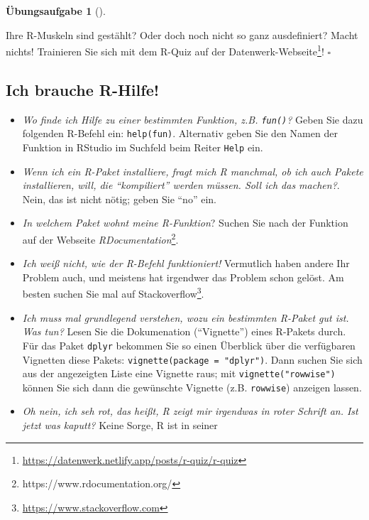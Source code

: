 \documentclass[
  a4paper,
  DIV=11]{scrreprt}
\providecommand{\tightlist}{%
  \setlength{\itemsep}{0pt}\setlength{\parskip}{0pt}}\usepackage{longtable,booktabs,array}
\theoremstyle{definition}
\newtheorem{exercise}{Übungsaufgabe}[chapter]
\theoremstyle{definition}
\theoremstyle{definition}
\theoremstyle{remark}
\begin{document}
\begin{exercise}[]\protect\hypertarget{exr-rquiz}{}\label{exr-rquiz}

Ihre R-Muskeln sind gestählt? Oder doch noch nicht so ganz ausdefiniert?
Macht nichts! Trainieren Sie sich mit dem R-Quiz auf der
Datenwerk-Webseite\footnote{\url{https://datenwerk.netlify.app/posts/r-quiz/r-quiz}}!
\(\square\)

\end{exercise}

\subsection{Ich brauche R-Hilfe!}\label{r-faq}

\begin{itemize}
\tightlist
\item
  \emph{Wo finde ich Hilfe zu einer bestimmten Funktion, z.B.
  \texttt{fun()}?} Geben Sie dazu folgenden R-Befehl ein:
  \texttt{help(fun)}. Alternativ geben Sie den Namen der Funktion in
  RStudio im Suchfeld beim Reiter \texttt{Help} ein.
\item
  \emph{Wenn ich ein R-Paket installiere, fragt mich R manchmal, ob ich
  auch Pakete installieren, will, die ``kompiliert'' werden müssen. Soll
  ich das machen?}. Nein, das ist nicht nötig; geben Sie ``no'' ein.
\item
  \emph{In welchem Paket wohnt meine R-Funktion}? Suchen Sie nach der
  Funktion auf der Webseite \emph{RDocumentation}\footnote{https://www.rdocumentation.org/}.
\item
  \emph{Ich weiß nicht, wie der R-Befehl funktioniert!} Vermutlich haben
  andere Ihr Problem auch, und meistens hat irgendwer das Problem schon
  gelöst. Am besten suchen Sie mal auf Stackoverflow\footnote{\url{https://www.stackoverflow.com}}.
\item
  \emph{Ich muss mal grundlegend verstehen, wozu ein bestimmten R-Paket
  gut ist. Was tun?} Lesen Sie die Dokumenation (``Vignette'') eines
  R-Pakets durch. Für das Paket \texttt{dplyr} bekommen Sie so einen
  Überblick über die verfügbaren Vignetten diese Pakets:
  \texttt{vignette(package\ =\ "dplyr")}. Dann suchen Sie sich aus der
  angezeigten Liste eine Vignette raus; mit \texttt{vignette("rowwise")}
  können Sie sich dann die gewünschte Vignette (z.B. \texttt{rowwise})
  anzeigen lassen.
\item
  \emph{Oh nein, ich seh rot, das heißt, R zeigt mir irgendwas in roter
  Schrift an. Ist jetzt was kaputt?} Keine Sorge, R ist in seiner

\end{itemize}
\end{document}
